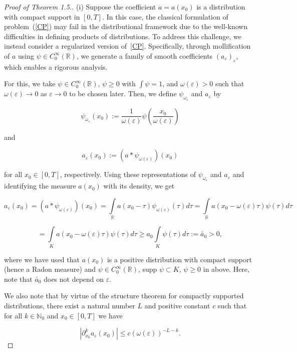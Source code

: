 \documentclass[12pt]{amsart}
\theoremstyle{definition}
\begin{document}
\noindent
\begin{proof}[Proof of Theorem 1.5.]
(i) Suppose the coefficient $a = a(x_0)$ is a distribution with compact support in $[0, T]$. In this case, the classical formulation of problem~(\ref{CP}) may fail in the distributional framework due to the well-known difficulties in defining products of distributions. To address this challenge, we instead consider a regularized version of~\eqref{CP}. Specifically, through mollification of $a$ using $\psi \in C_{0}^{\infty}(\mathbb{R})$, we generate a family of smooth coefficients $(a_{\varepsilon})_{\varepsilon}$, which enables a rigorous analysis.

For this, we take $\psi\in C_{0}^{\infty}(\mathbb{R})$, $\psi\geq 0$ with $\int\psi=1$, and $\omega(\varepsilon)>0$ such that $\omega(\varepsilon)\to 0$ as $\varepsilon\to 0$ to be chosen later. Then, we define $\psi_{\omega_{\varepsilon}}$ and $a_{\varepsilon}$ by

\[
\psi_{\omega_{\varepsilon}}(x_0):=\frac{1}{\omega(\varepsilon)}\psi\left(\frac{x_0}{\omega(\varepsilon)}\right)
\]

and

\[
a_{\varepsilon}(x_0):=(a*\psi_{\omega(\varepsilon)})(x_0)
\]

for all $x_0\in[0,T]$, respectively. Using these representations of $\psi_{\omega_{\varepsilon}}$ and $a_{\varepsilon}$ and identifying the measure $a(x_0)$ with its density, we get

\[
a_{\varepsilon}(x_0)=(a*\psi_{\omega(\varepsilon)})(x_0)=\int\limits_{\mathbb{R}}a(x_0-\tau)\psi_{\omega(\varepsilon)}(\tau)d\tau=\int\limits_{\mathbb{R}}a(x_0-\omega(\varepsilon)\tau)\psi(\tau)d\tau
\]

\[
=\int\limits_{K}a(x_0-\omega(\varepsilon)\tau)\psi(\tau)d\tau\geq a_{0}\int\limits_{K}\psi(\tau)d\tau:=\widetilde{a_{0}}>0,
\]

where we have used that $a(x_0)$ is a positive distribution with compact support (hence a Radon measure) and $\psi\in C_{0}^{\infty}(\mathbb{R})$, supp $\psi\subset K$, $\psi\geq 0$ in above. Here, note that $\widetilde{a_{0}}$ does not depend on $\varepsilon$.

We also note that by virtue of the structure theorem for compactly supported distributions, there exist a natural number $L$ and positive constant $c$ such that for all $k\in\mathbb{N}_{0}$ and $x_0\in[0,T]$ we have

\begin{equation}
   |\partial_{x_0}^{k}a_{\varepsilon}(x_0)|\leq c(\omega(\varepsilon))^{-L-k}.
\label{eq3.3-hipoel} 
\end{equation}



\end{proof}
\end{document}
